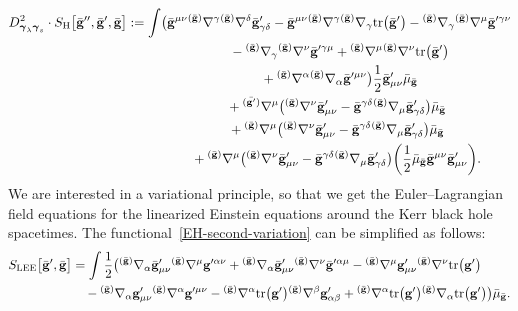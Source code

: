 \documentclass[11pt]{article}
\numberwithin{equation}{section}
\def\mbo#1{\boldsymbol{#1}}%
\def\grad{{\nabla}}%
\newcommand{\leftexp}[2]{{\vphantom{#2}}^{#1}{#2}}
\def\halb{\frac{1}{2}}%
\def \gm{\gamma}
\def \a{\alpha}
\def \b {\beta}
\renewcommand{\gg}{{\bf g}}
\newcommand{\bgg}{{\bar{\bf g}}}
\renewcommand{\a}{\alpha}
\renewcommand{\b}{\beta}
\renewcommand{\d}{\delta}
\newcommand{\la}{\lambda}
\numberwithin{equation}{section}
\begin{document}
\begin{gather}
D^2_{\mbo{\gamma}_\la \mbo{\gamma}_s} \cdot S_{\text{H}} \bigl[\bgg'', \bgg', \bgg\bigr] := \int
\bigl( \bgg^{\mu \nu} \leftexp{(\bar{\gg})}{\grad}^\gm \leftexp{(\bar{\gg})}{\grad}^\d \bgg'_{\gm \d} - \bgg^{\mu \nu} \leftexp{(\bar{\gg})}{\grad}^\gm \leftexp{(\bar{\gg})}{\grad}_\gm {\rm tr} \bigl(\bgg'\bigr)- \leftexp{(\bar{\gg})}{\grad}_\gm \leftexp{(\bar{\gg})}{\grad}^\mu \bgg'^{\gm \nu}
\notag\\
 \hphantom{D^2_{\mbo{\gamma}_\la \mbo{\gamma}_s} \cdot S_{\text{H}} \bigl[\bgg'', \bgg', \bgg\bigr] := \int\bigl(}{}
- \leftexp{(\bar{\gg})}{\grad}_\gm \leftexp{(\bar{\gg})}{\grad}^\nu \bgg'^{\gm \mu}
+ \leftexp{(\bar{\gg})}{\grad}^\mu \leftexp{(\bar{\gg})}{\grad}^\nu {\rm tr}\bigl(\bgg '\bigr) \notag\\
 \hphantom{D^2_{\mbo{\gamma}_\la \mbo{\gamma}_s} \cdot S_{\text{H}} \bigl[\bgg'', \bgg', \bgg\bigr] := \int\bigl(}{}
+ \leftexp{(\bar{\gg})}{\grad}^\a \leftexp{(\bar{\gg})}{\grad}_\a \bgg'^{\mu \nu} \bigr) \halb \bgg'_{\mu \nu} \bar{\mu}_\bgg \notag\\
 \hphantom{D^2_{\mbo{\gamma}_\la \mbo{\gamma}_s} \cdot S_{\text{H}} \bigl[\bgg'', \bgg', \bgg\bigr] :=\int}{}
 + \leftexp{(\bar{\gg'})}{\grad}^\mu\bigl( \leftexp{(\bar{\gg})}{\grad}^\nu \bgg'_{\mu \nu} - \bgg^{\gm \d} \leftexp{(\bar{\gg})}{\grad}_\mu \bgg'_{\gm \d}\bigr) \bar{\mu}_{\bgg}
\notag\\
 \hphantom{D^2_{\mbo{\gamma}_\la \mbo{\gamma}_s} \cdot S_{\text{H}} \bigl[\bgg'', \bgg', \bgg\bigr] :=\int}{}
+ \leftexp{(\bar{\gg})}{\grad}^\mu \bigl(\leftexp{(\bar{\gg})}{\grad}^\nu \bgg'_{ \mu \nu} - \bgg^{\gm \d} \leftexp{(\bar{\gg})}{\grad}_\mu \bgg'_{\gm \d}\bigr) \bar{\mu}_\bgg \notag\\
 \hphantom{D^2_{\mbo{\gamma}_\la \mbo{\gamma}_s} \cdot S_{\text{H}} \bigl[\bgg'', \bgg', \bgg\bigr] :=\int}{}
 + \leftexp{(\bar{\gg})}{\grad}^\mu \bigl(\leftexp{(\bar{\gg})}{\grad}^\nu \bgg'_{\mu \nu} - \bgg^{\gm \d} \leftexp{(\bar{\gg})}{\grad}_\mu \bgg'_{ \gm \d}\bigr) \biggl(\halb \bar{\mu}_\bgg \bgg^{\mu \nu} \bgg'_{\mu \nu}\biggr).\label{EH-second-variation}
\end{gather}
We are interested in a variational principle, so that we get the Euler--Lagrangian field equations for the linearized Einstein equations around the Kerr black hole spacetimes. The functional~\eqref{EH-second-variation} can be simplified as follows:
\begin{align}\label{LG-Lagrangian}
S_{\text{LEE}}\bigl[\bar{\gg}', \bar{\gg}\bigr] &{}= \int \halb \bigl(\leftexp{(\bar{\gg})}{\grad}_\a \bar{\gg}'_{\mu \nu} \leftexp{(\bar{\gg})}{\grad}^\mu \gg'^{\a \nu} + \leftexp{(\bar{\gg})}{\grad}_\a \bar{\gg}'_{\mu \nu} \leftexp{(\bar{\gg})}{\grad}^\nu \bar{\gg}'^{\a \mu} - \leftexp{(\bar{\gg})}{\grad}^\mu \gg'_{\mu \nu} \leftexp{(\bar{\gg})}{\grad}^\nu {\rm tr} \bigl(\gg'\bigr)\\
&\quad{} - \leftexp{(\bar{\gg})}{\grad}_\a \gg'_{\mu \nu} \leftexp{(\bar{\gg})}{\grad}^\a \gg'^{\mu \nu}
- \leftexp{(\bar{\gg})}{\grad}^\a {\rm tr} \bigl(\gg'\bigr) \leftexp{(\bar{\gg})}{\grad}^\b \gg'_{\a \b} +
\leftexp{(\bar{\gg})}{\grad} ^\a {\rm tr} \bigl(\gg'\bigr) \leftexp{(\bar{\gg})}{\grad}_\a {\rm tr}\bigl(\gg'\bigr) \bigr) \bar{\mu}_{\bar{\gg}}. \notag
\end{align}
\end{document}
